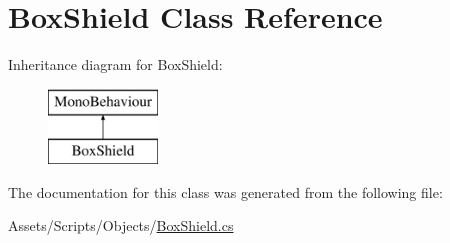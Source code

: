 \hypertarget{class_box_shield}{}\section{Box\+Shield Class Reference}
\label{class_box_shield}
Inheritance diagram for Box\+Shield\+:\begin{figure}[H]
\begin{center}
\leavevmode
\includegraphics[height=2.000000cm]{class_box_shield}
\end{center}
\end{figure}


The documentation for this class was generated from the following file\+:\begin{DoxyCompactItemize}
\item 
Assets/\+Scripts/\+Objects/\mbox{\hyperlink{_box_shield_8cs}{Box\+Shield.\+cs}}\end{DoxyCompactItemize}
